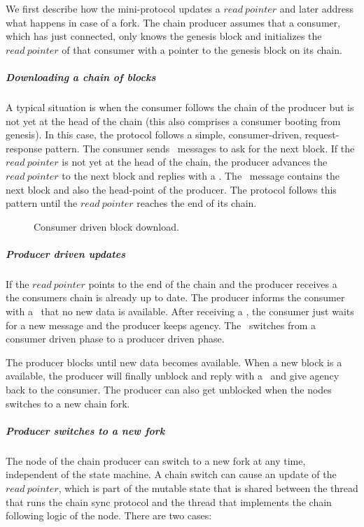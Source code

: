 \documentclass{report}
\theoremstyle{definition}{
  \newtheorem{lemma}{Lemma}[section] %
  \newtheorem{definition}[lemma]{Definition}
}
\theoremstyle{theorem}{
  \newtheorem{invariant}[lemma]{Invariant}
  \newtheorem{proofobligation}[lemma]{Proof Obligation}
}
\numberwithin{equation}{lemma}
\begin{document}
We first describe how the mini-protocol updates a $read~pointer$ and later address what happens in case
of a fork.
The chain producer assumes that a consumer, which has just connected,
only knows the genesis block and initializes the $read~pointer$ of that consumer
with a pointer to the genesis block on its chain.

\subparagraph{Downloading a chain of blocks}
A typical situation is when the consumer follows the chain of the producer but is not yet at the head of the
chain (this also comprises a consumer booting from genesis).
In this case, the protocol follows a simple, consumer-driven, request-response pattern.
The consumer sends \RequestNext~messages to ask for the next block.
If the $read~pointer$ is not yet at the head of the chain,
the producer advances the $read~pointer$ to the next block and replies with a \RollForward.
The \RollForward~message contains the next block and also the head-point of the producer.
The protocol follows this pattern until the $read~pointer$ reaches the end of its chain.

\begin{figure}[h]
\begin{center}
\end{center}
\caption{Consumer driven block download.}
\label{read-pointer-consumer-driver}
\end{figure}


\subparagraph{Producer driven updates}
If the $read~pointer$ points to the end of the chain and the producer receives a \RequestNext~
the consumers chain is already up to date.
The producer informs the consumer with a \AwaitReply~that no new data is available.
After receiving a \AwaitReply, the consumer just waits for a new message and the producer keeps agency.
The \AwaitReply~switches from a consumer driven phase to a producer driven phase.

The producer blocks until new data becomes available.
When a new block is a available, the producer will finally unblock and
reply with a \RollForward~and give agency back to the consumer.
The producer can also get unblocked when the nodes switches to a new chain fork.

\subparagraph{Producer switches to a new fork}
The node of the chain producer can switch to a new fork at any time, independent of the
state machine.
A chain switch can cause an update of the $read~pointer$,
which is part of the mutable state that is shared between the thread that runs
the chain sync protocol and the thread that implements the chain following logic of the node.
There are two cases:
\end{document}
